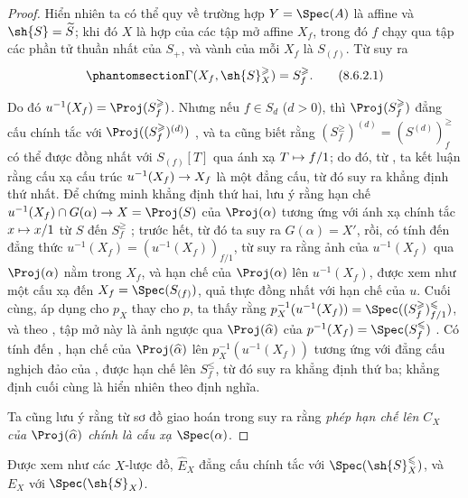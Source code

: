 \documentclass[oneside,10pt]{amsart}
\makeatletter
\renewcommand{\leq}{\leqslant}
\renewcommand{\geq}{\geqslant}
\newcommand{\ega@arrow}[2]{\mathchoice{#1}{#2}{#2}{#2}}
\let\ega@shortmapsto\mapsto
\renewcommand{\to}{\ega@arrow{\longrightarrow}{\rightarrow}}
\renewcommand{\mapsto}{\ega@arrow{\longmapsto}{\ega@shortmapsto}}
\newcommand{\oldpage}[2][]{\marginnote{\normalfont\footnotesize\textbf{#1}~|~#2}\ignorespaces}
\let\EGAOriginalLabel\label
\renewcommand{\label}[1]{\phantomsection\EGAOriginalLabel{#1}}
\newcommand*{\ega@labelnumber}[1]{\StrBehind{#1}{.}}
\newcommand{\eref}[1]{\hyperref[#1]{\normalfont{(\ega@labelnumber{#1})}}}
\makeatother
\begin{document}
\begin{proof}
Hiển nhiên ta có thể quy về trường hợp $Y=\Spec(A)$ là affine và $\sh{S}=\widetilde{S}$;
khi đó $X$ là hợp của các tập mở affine $X_f$, trong đó $f$ chạy qua tập các phần tử thuần nhất của $S_+$, và vành của mỗi $X_f$ là $S_{(f)}$.
Từ  suy ra
\[
\label{II.8.6.2.1}
  \Gamma(X_f, \sh{S}_X^\geq) = S_f^\geq.
\tag{8.6.2.1}
\]

Do đó $u^{-1}(X_f)=\Proj(S_f^\geq)$.
Nhưng nếu $f\in S_d$ ($d>0$), thì $\Proj(S_f^\geq)$ đẳng cấu chính tắc với $\Proj((S_f^\geq)^{(d)})$ , và ta cũng biết rằng $(S_f^\geq)^{(d)}=(S^{(d)})_f^\geq$ có thể được đồng nhất với $S_{(f)}[T]$  qua ánh xạ $T\mapsto f/1$;
do đó, từ , ta kết luận rằng cấu xạ cấu trúc $u^{-1}(X_f)\to X_f$ là một đẳng cấu, từ đó suy ra khẳng định thứ nhất.
Để chứng minh khẳng định thứ hai, lưu ý rằng hạn chế $u^{-1}(X_f)\cap G(\alpha)\to X=\Proj(S)$ của $\Proj(\alpha)$ tương ứng với ánh xạ chính tắc $x\mapsto x/1$ từ $S$ đến $S_f^\geq$ ;
trước hết, từ đó ta suy ra $G(\alpha)=X'$, rồi, có tính đến đẳng thức $u^{-1}(X_f)=(u^{-1}(X_f))_{f/1}$, từ  suy ra rằng ảnh của $u^{-1}(X_f)$ qua $\Proj(\alpha)$ nằm trong $X_f$, và hạn chế của $\Proj(\alpha)$ lên $u^{-1}(X_f)$, được xem như một cấu xạ đến $X_f=\Spec(S_{(f)})$, quả thực đồng nhất với hạn chế của $u$.
Cuối cùng, áp dụng  cho $p_X$ thay cho $p$, ta thấy rằng $p_X^{-1}(u^{-1}(X_f)) = \Spec((S_f^\geq)_{f/1}^\leq)$, và theo , tập mở này là ảnh ngược qua $\Proj(\widehat{\alpha})$ của $p^{-1}(X_f)=\Spec(S_f^\leq)$ .
Có tính đến , hạn chế của $\Proj(\widehat{\alpha})$ lên $p_X^{-1}(u^{-1}(X_f))$ tương ứng với đẳng cấu nghịch đảo của , được hạn chế lên $S_f^\leq$, từ đó suy ra khẳng định thứ ba;
khẳng định cuối cùng là hiển nhiên theo định nghĩa.

\oldpage[II]{173}
Ta cũng lưu ý rằng từ sơ đồ giao hoán trong \eref{eq:2.8.5.3.2} suy ra rằng \emph{phép hạn chế lên $C_X$ của $\Proj(\widehat{\alpha})$ chính là cấu xạ $\Spec(\alpha)$}.
\end{proof}
\begin{corollary}[8.6.3]
\label{II.8.6.3}
Được xem như các $X$-lược đồ, $\widehat{E}_X$ đẳng cấu chính tắc với $\Spec(\sh{S}_X^\leq)$, và $E_X$ với $\Spec(\sh{S}_X)$.
\end{corollary}
\end{document}
